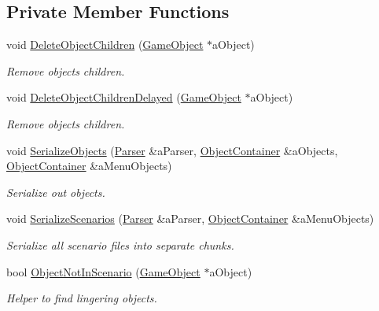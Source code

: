 \subsection*{Private Member Functions}
\begin{DoxyCompactItemize}
\item 
void \hyperlink{classLevel_a72b7ed47a05862f51571aa9c89d26b28}{Delete\+Object\+Children} (\hyperlink{classGameObject}{Game\+Object} $\ast$a\+Object)
\begin{DoxyCompactList}\small\item\em Remove object\textquotesingle{}s children. \end{DoxyCompactList}\item 
void \hyperlink{classLevel_a5fbd1c5322dcbdd0abb5387afac57a27}{Delete\+Object\+Children\+Delayed} (\hyperlink{classGameObject}{Game\+Object} $\ast$a\+Object)
\begin{DoxyCompactList}\small\item\em Remove object\textquotesingle{}s children. \end{DoxyCompactList}\item 
void \hyperlink{classLevel_adeba76a68f04c29606cde4f9f7b4fd6d}{Serialize\+Objects} (\hyperlink{classParser}{Parser} \&a\+Parser, \hyperlink{classLevel_afd39ad8a5d9272ab8e14853e0fb18a48}{Object\+Container} \&a\+Objects, \hyperlink{classLevel_afd39ad8a5d9272ab8e14853e0fb18a48}{Object\+Container} \&a\+Menu\+Objects)
\begin{DoxyCompactList}\small\item\em Serialize out objects. \end{DoxyCompactList}\item 
void \hyperlink{classLevel_a8ee3f3906d5a03dd7da6e07db4147d47}{Serialize\+Scenarios} (\hyperlink{classParser}{Parser} \&a\+Parser, \hyperlink{classLevel_afd39ad8a5d9272ab8e14853e0fb18a48}{Object\+Container} \&a\+Menu\+Objects)
\begin{DoxyCompactList}\small\item\em Serialize all scenario files into separate chunks. \end{DoxyCompactList}\item 
bool \hyperlink{classLevel_a4bad55a8d12b5ce6648c7e0f291f830b}{Object\+Not\+In\+Scenario} (\hyperlink{classGameObject}{Game\+Object} $\ast$a\+Object)
\begin{DoxyCompactList}\small\item\em Helper to find lingering objects. \end{DoxyCompactList}\item 

\end{DoxyCompactItemize}
